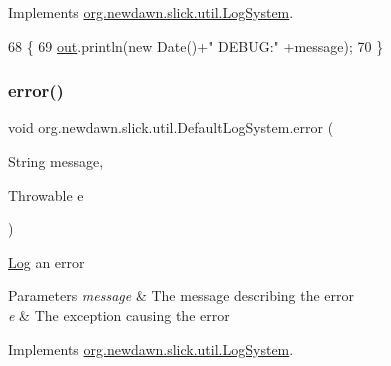 Implements \mbox{\hyperlink{interfaceorg_1_1newdawn_1_1slick_1_1util_1_1_log_system_af8c0140f915bdebab6ac9062e9fea015}{org.\+newdawn.\+slick.\+util.\+Log\+System}}.


\begin{DoxyCode}
68                                       \{
69         \mbox{\hyperlink{classorg_1_1newdawn_1_1slick_1_1util_1_1_default_log_system_af8720c665caabb6455863d23de8617da}{out}}.println(\textcolor{keyword}{new} Date()+\textcolor{stringliteral}{" DEBUG:"} +message);
70     \}
\end{DoxyCode}
\mbox{\label{classorg_1_1newdawn_1_1slick_1_1util_1_1_default_log_system_a4ba3a42657c5f7ee2c55fa49dbe7a287}} 
\subsubsection{\texorpdfstring{error()}{error()}\hspace{0.1cm}{\footnotesize\ttfamily [1/3]}}
{\footnotesize\ttfamily void org.\+newdawn.\+slick.\+util.\+Default\+Log\+System.\+error (\begin{DoxyParamCaption}\item[{String}]{message,  }\item[{Throwable}]{e }\end{DoxyParamCaption})\hspace{0.3cm}{\ttfamily [inline]}}

\mbox{\hyperlink{classorg_1_1newdawn_1_1slick_1_1util_1_1_log}{Log}} an error


\begin{DoxyParams}{Parameters}
{\em message} & The message describing the error \\
\hline
{\em e} & The exception causing the error \\
\hline
\end{DoxyParams}


Implements \mbox{\hyperlink{interfaceorg_1_1newdawn_1_1slick_1_1util_1_1_log_system_a9ba18920fcc1e6b04324a1b9dfb40640}{org.\+newdawn.\+slick.\+util.\+Log\+System}}.


